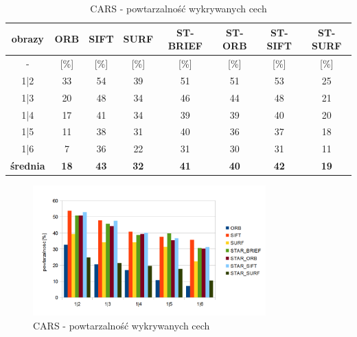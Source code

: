 \begin{table}[htbp]
  \centering
  \caption{CARS - powtarzalność wykrywanych cech}
    \begin{tabular}{|c|c|c|c|c|c|c|c|}\hline

    obrazy & \textbf{ORB} & \textbf{SIFT} & \textbf{SURF} & \textbf{ST-BRIEF} & \textbf{ST-ORB} & \textbf{ST-SIFT} & \textbf{ST-SURF} \\\hline

    -  & [\%] & [\%] & [\%] & [\%] & [\%] & [\%] & [\%] \\\hline
    1|2 & 33 & 54 & 39 & 51 & 51 & 53 & 25 \\
    1|3 & 20 & 48 & 34 & 46 & 44 & 48 & 21 \\
    1|4 & 17 & 41 & 34 & 39 & 39 & 40 & 20 \\
    1|5 & 11 & 38 & 31 & 40 & 36 & 37 & 18 \\
    1|6 & 7 & 36 & 22 & 31 & 30 & 31 & 11 \\\hline
    \textbf{średnia} & \textbf{18} & \textbf{43} & \textbf{32} & \textbf{41} & \textbf{40} & \textbf{42} & \textbf{19} \\\hline
    
    \end{tabular}%
  \label{tab:cars_m1}%
\end{table}%


\begin{figure}
\centering
\includegraphics[width=0.8\textwidth]{pict/mikolajczyk/light/m1.png}
\caption{CARS - powtarzalność wykrywanych cech}
\label{fig:cars_m1}
\end{figure}

